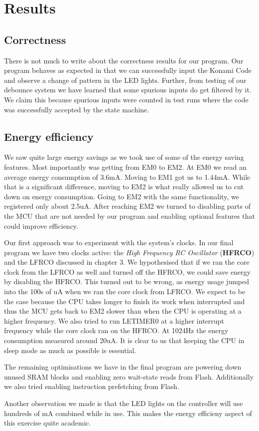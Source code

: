 \chapter{Results}

\section{Correctness}

There is not much to write about the correctness results for our program. Our
program behaves as expected in that we can successfully input the Konami Code
and observe a change of pattern in the LED lights. Further, from testing of our
debounce system we have learned that some spurious inputs do get filtered by it.
We claim this because spurious inputs were counted in test runs where the code
was successfully accepted by the state machine.

\section{Energy efficiency}

We saw quite large energy savings as we took use of some of the energy saving
features. Most importantly was getting from EM0 to EM2. At EM0 we read an
average energy consumption of 3.6mA. Moving to EM1 got us to 1.44mA. While that
is a significant difference, moving to EM2 is what really allowed us to cut down
on energy consumption. Going to EM2 with the same functionality, we registered
only about 2.5uA. After reaching EM2 we turned to disabling parts of the MCU
that are not needed by our program and enabling optional features that could
improve efficiency.

Our first approach was to experiment with the system's clocks. In our final
program we have two clocks active: the \emph{High Frequency RC Oscillator}
(\textbf{HFRCO}) and the LFRCO discussed in chapter 3. We hypothesised that if
we ran the core clock from the LFRCO as well and turned off the HFRCO, we could
save energy by disabling the HFRCO. This turned out to be wrong, as energy usage
jumped into the 100s of uA when we ran the core clock from LFRCO. We expect to
be the case because the CPU takes longer to finish its work when interrupted and
thus the MCU gets back to EM2 slower than when the CPU is operating at a higher
frequency. We also tried to run LETIMER0 at a higher interrupt frequency while
the core clock ran on the HFRCO. At 1024Hz the energy consumption measured
around 20uA. It is clear to us that keeping the CPU in sleep mode as much as
possible is essential.

The remaining optimisations we have in the final program are powering down
unused SRAM blocks and enabling zero wait-state reads from Flash. Additionally
we also tried enabling instruction prefetching from Flash.

Another observation we made is that the LED lights on the controller will use
hundreds of mA combined while in use. This makes the energy efficieny aspect of
this exercise quite academic.
